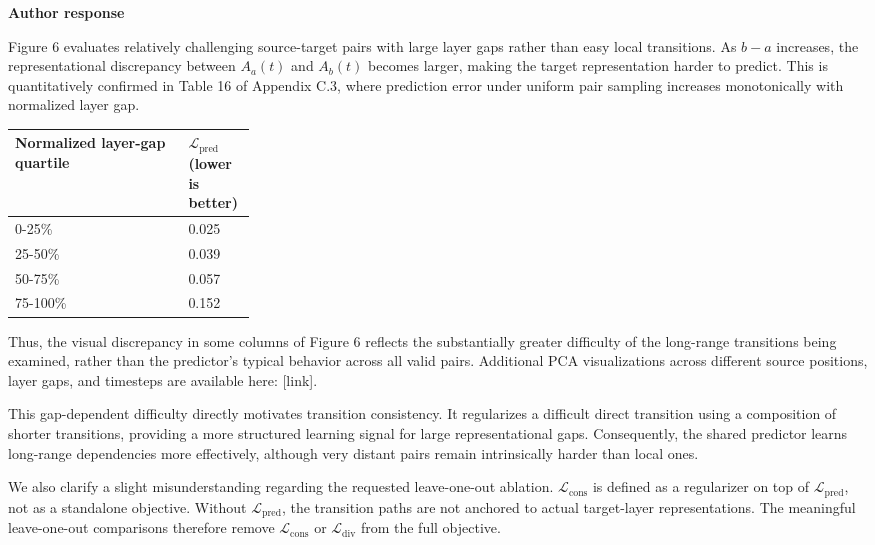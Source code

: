 \documentclass[10pt,letterpaper]{article}
\newcommand{\SectionLabel}[1]{%
  {\small\bfseries\color{blue}#1\par}\vspace{0.08em}
}
\begin{document}
\SectionLabel{Author response}

\begin{answerbox}

Figure 6 evaluates relatively challenging source-target pairs with large layer gaps rather than easy local transitions. As \(b-a\) increases, the representational discrepancy between \(A_a(t)\) and \(A_b(t)\) becomes larger, making the target representation harder to predict. This is quantitatively confirmed in Table 16 of Appendix C.3, where prediction error under uniform pair sampling increases monotonically with normalized layer gap.


\begin{cleanTable}
\small
\begin{tabularx}{\linewidth}{Y C{0.28\linewidth}}
\bfseries\color{white} Normalized layer-gap quartile & \bfseries\color{white} \(\mathcal{L}_{\mathrm{pred}}\) (lower is better) \\
-25\% & 0.025 \\
25-50\% & 0.039 \\
50-75\% & 0.057 \\
75-100\% & 0.152 \\
\end{tabularx}
\end{cleanTable}


Thus, the visual discrepancy in some columns of Figure 6 reflects the substantially greater difficulty of the long-range transitions being examined, rather than the predictor's typical behavior across all valid pairs. Additional PCA visualizations across different source positions, layer gaps, and timesteps are available here: [link].


This gap-dependent difficulty directly motivates transition consistency. It regularizes a difficult direct transition using a composition of shorter transitions, providing a more structured learning signal for large representational gaps. Consequently, the shared predictor learns long-range dependencies more effectively, although very distant pairs remain intrinsically harder than local ones.


We also clarify a slight misunderstanding regarding the requested leave-one-out ablation. \(\mathcal{L}_{\mathrm{cons}}\) is defined as a regularizer on top of \(\mathcal{L}_{\mathrm{pred}}\), not as a standalone objective. Without \(\mathcal{L}_{\mathrm{pred}}\), the transition paths are not anchored to actual target-layer representations. The meaningful leave-one-out comparisons therefore remove \(\mathcal{L}_{\mathrm{cons}}\) or \(\mathcal{L}_{\mathrm{div}}\) from the full objective.



\end{answerbox}
\end{document}
